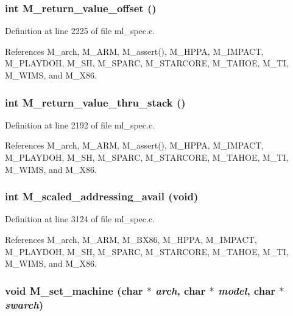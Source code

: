 \subsubsection{\setlength{\rightskip}{0pt plus 5cm}int M\_\-return\_\-value\_\-offset ()}\label{m__spec_8h_b90bfd0e894f9f91975d9db558a0ed9d}




Definition at line 2225 of file ml\_\-spec.c.

References M\_\-arch, M\_\-ARM, M\_\-assert(), M\_\-HPPA, M\_\-IMPACT, M\_\-PLAYDOH, M\_\-SH, M\_\-SPARC, M\_\-STARCORE, M\_\-TAHOE, M\_\-TI, M\_\-WIMS, and M\_\-X86.
\subsubsection{\setlength{\rightskip}{0pt plus 5cm}int M\_\-return\_\-value\_\-thru\_\-stack ()}\label{m__spec_8h_7bad6789a91fd4b1a419d09d79ec7c91}




Definition at line 2192 of file ml\_\-spec.c.

References M\_\-arch, M\_\-ARM, M\_\-assert(), M\_\-HPPA, M\_\-IMPACT, M\_\-PLAYDOH, M\_\-SH, M\_\-SPARC, M\_\-STARCORE, M\_\-TAHOE, M\_\-TI, M\_\-WIMS, and M\_\-X86.
\subsubsection{\setlength{\rightskip}{0pt plus 5cm}int M\_\-scaled\_\-addressing\_\-avail (void)}\label{m__spec_8h_f0559708fe5ede7554b03c992054b109}




Definition at line 3124 of file ml\_\-spec.c.

References M\_\-arch, M\_\-ARM, M\_\-BX86, M\_\-HPPA, M\_\-IMPACT, M\_\-PLAYDOH, M\_\-SH, M\_\-SPARC, M\_\-STARCORE, M\_\-TAHOE, M\_\-TI, M\_\-WIMS, and M\_\-X86.
\subsubsection{\setlength{\rightskip}{0pt plus 5cm}void M\_\-set\_\-machine (char $\ast$ {\em arch}, char $\ast$ {\em model}, char $\ast$ {\em swarch})}\label{m__spec_8h_f7bdbcffae1c00065683e3ede827e9f1}




